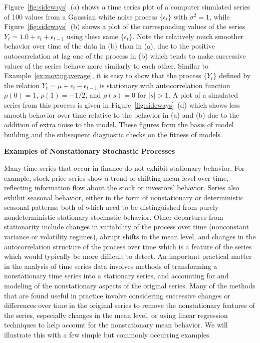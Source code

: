 \begin{ex}
Figure~\ref{fig:sideways}~(a) shows a time series plot of a computer simulated series of 100 values from a Gaussian white noise process $\{ \epsilon_t \}$ with $\sigma^2= 1$, while Figure~\ref{fig:sideways}~(b) shows a plot of the corresponding values of the series $Y_t = 1.0 + \epsilon_{t} + \epsilon_{t-1}$ using these same $\{\epsilon_t\}$.  Note the relatively much smoother behavior over time of the data in (b) than in (a), due to the positive autocorrelation at lag one of the process in (b) which tends to make successive values of the series behave more similarly to each other.  Similar to Example~\ref{ex:movingaverage}, it is easy to show that the process $\{Y_t\}$ defined by the relation $Y_t = \mu + \epsilon_{t} - \epsilon_{t-1}$ is stationary with autocorrelation function $\rho(0)= 1$, $\rho(1)= -1/2$, and $\rho(s)= 0$ for $\lvert s\rvert >1$. A plot of a simulated series from this process is given in Figure~\ref{fig:sideways}~(d) which shows less smooth behavior over time relative to the behavior  in (a) and (b) due to the addition of extra noise to the model. These figures form the basis of model building and the subsequent diagnostic checks on the fitness of models.
\end{ex} 


\noindent \textbf{Examples of Nonstationary Stochastic Processes} \twomedskip


Many time series that occur in finance do not exhibit stationary behavior.  For example, stock price series show a trend or shifting mean level over time, reflecting information flow about the stock or investors' behavior. Series also exhibit seasonal behavior, either in the form of nonstationary or deterministic seasonal patterns, both of which need to be distinguished from purely nondeterministic stationary stochastic behavior. Other departures from stationarity include changes in variability of the process over time (nonconstant variance or volatility regimes), abrupt shifts in the mean level, and changes in the autocorrelation structure of the process over time which is a feature of the series which would typically be more difficult to detect.  An important practical matter in the analysis of time series data involves methods of transforming a nonstationary time series into a stationary series, and accounting for and modeling of the nonstationary aspects of the original series. Many of the methods that are found useful in practice involve considering successive changes or differences over time in the original series to remove the nonstationary features of the series, especially changes in the mean level, or using linear regression techniques to help account for the nonstationary mean behavior.  We will illustrate this with a few simple but commonly occurring examples. 


